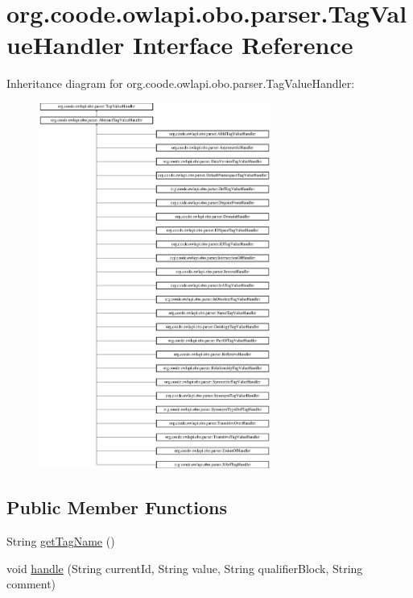 \hypertarget{interfaceorg_1_1coode_1_1owlapi_1_1obo_1_1parser_1_1_tag_value_handler}{\section{org.\-coode.\-owlapi.\-obo.\-parser.\-Tag\-Value\-Handler Interface Reference}
\label{interfaceorg_1_1coode_1_1owlapi_1_1obo_1_1parser_1_1_tag_value_handler}
}
Inheritance diagram for org.\-coode.\-owlapi.\-obo.\-parser.\-Tag\-Value\-Handler\-:\begin{figure}[H]
\begin{center}
\leavevmode
\includegraphics[height=12.000000cm]{interfaceorg_1_1coode_1_1owlapi_1_1obo_1_1parser_1_1_tag_value_handler}
\end{center}
\end{figure}
\subsection*{Public Member Functions}
\begin{DoxyCompactItemize}
\item 
String \hyperlink{interfaceorg_1_1coode_1_1owlapi_1_1obo_1_1parser_1_1_tag_value_handler_a052d43d1b97011c56a92c068565a7feb}{get\-Tag\-Name} ()
\item 
void \hyperlink{interfaceorg_1_1coode_1_1owlapi_1_1obo_1_1parser_1_1_tag_value_handler_ada360977867550649d701384c224a601}{handle} (String current\-Id, String value, String qualifier\-Block, String comment)
\end{DoxyCompactItemize}


